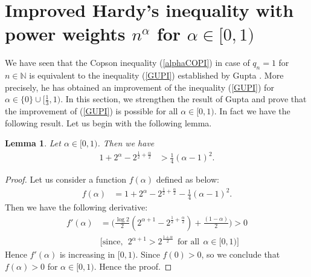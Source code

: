 \documentclass[12pt]{amsart}
\newtheorem{Lemma}[Theorem]{\sc Lemma}
\theoremstyle{definition}
\theoremstyle{plain}
\theoremstyle{definition}
\numberwithin{equation}{section}
\begin{document}
\section{Improved Hardy's inequality with power weights $n^\alpha$ for $\alpha\in [0, 1)$}
We have seen that the Copson inequality (\ref{alphaCOPI}) in case of $q_n=1$ for $n\in \mathbb{N}$ is equivalent to the inequality (\ref{GUPI}) established by Gupta \cite{SGA}. More precisely, he has obtained an improvement of the inequality (\ref{GUPI}) for $\alpha\in \{0\}\cup[\frac{1}{3}, 1)$. In this section, we strengthen the result of Gupta \cite{SGA} and prove that the improvement of (\ref{GUPI}) is possible for all $\alpha\in [0, 1)$. In fact we have the following result. Let us begin with the following lemma.
\begin{Lemma}{\label{W-1gater}}
Let $\alpha\in[0, 1)$. Then we have
\begin{align*}
1+2^{\alpha}-2^{\frac{1}{2}+\frac{\alpha}{2}}& >\frac{1}{4}(\alpha-1)^2.
\end{align*}
\end{Lemma}
\begin{proof}
Let us consider a function $f(\alpha)$ defined as below:
\begin{align*}
f(\alpha)&=1+2^{\alpha}-2^{\frac{1}{2}+\frac{\alpha}{2}}-\frac{1}{4}(\alpha-1)^2.
\end{align*}
Then we have the following derivative:
\begin{align*}
f'(\alpha)&=\Big(\frac{\log2}{2}(2^{\alpha+1}-2^{\frac{1}{2}+\frac{\alpha}{2}})+\frac{(1-\alpha)}{2}\Big)>0\\
&\Big[\mbox{since},~~2^{\alpha+1}>2^{\frac{1+\alpha}{2}}~~\mbox{for~all}~~\alpha\in[0, 1)\Big]
\end{align*} Hence $f'(\alpha)$ is increasing in $[0, 1)$. Since $f(0)>0$, so we conclude that $f(\alpha)>0$ for $\alpha\in[0, 1)$. Hence the proof.
\end{proof}
\end{document}
